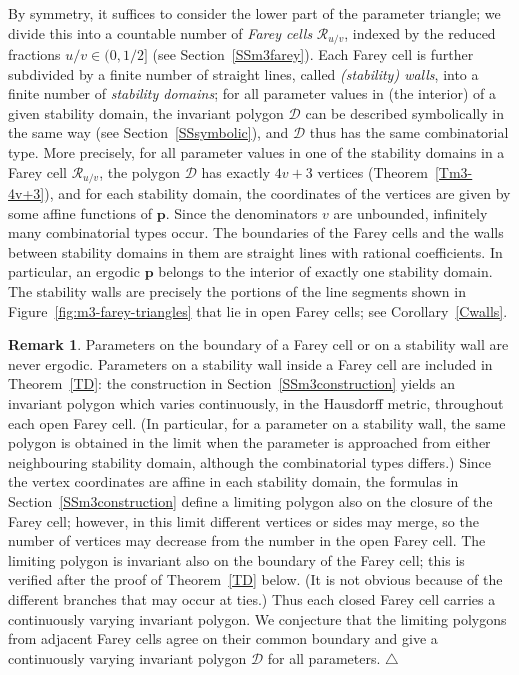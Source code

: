 \documentclass[11pt,reqno,tbtags,a4paper]{amsart}
\numberwithin{equation}{section}
\theoremstyle{plain}%
\theoremstyle{definition}
\newcommand\xqed[1]{%
    \leavevmode\unskip\penalty9999 \hbox{}\nobreak\hfill
    \quad\hbox{#1}}
\newtheorem{remarkqqq}[theorem]{Remark}
\newenvironment{remark}{\begin{remarkqqq}}
  {\xqed{$\triangle$}\end{remarkqqq}}
\theoremstyle{remark}
\newcommand{\refT}[1]{Theorem~\ref{#1}}
\newcommand{\refC}[1]{Corollary~\ref{#1}}
\newcommand{\refSS}[1]{Section~\ref{#1}}
\newcommand{\refFig}[1]{Figure~\ref{#1}}
\newcounter{cc}
\newcommand\cD{\mathcal D}
\newcommand\cR{{\mathcal R}}
\newcommand\vp{\mathbf{p}}
\newcommand\0{{\boldsymbol 0}}
\newcommand\1{{\boldsymbol 1}}
\begin{document}
By symmetry, it suffices to consider
the lower part of the parameter triangle; we divide this into a 
countable number of
\emph{Farey cells} $\cR_{u/v}$, 
indexed by the reduced fractions $u/v\in(0,1/2]$
(see \refSS{SSm3farey}).
Each Farey cell is further subdivided 
by a finite number of straight lines, 
called \emph{(stability) walls},
into a finite number of 
\emph{stability domains};
for all parameter values in (the interior) of a given stability domain,
the invariant polygon $\cD$ 
can be described symbolically in the same way (see \refSS{SSsymbolic}),
and $\cD$ thus has the same combinatorial type.
More precisely, for all parameter values in one of the stability domains in a
Farey cell $\cR_{u/v}$, 
the polygon $\cD$  has exactly $4v+3$ vertices
(\refT{Tm3-4v+3}), 
and for each stability domain, 
the coordinates of the vertices are given by some affine functions of $\vp$.
Since the denominators $v$ are unbounded, infinitely many combinatorial types
occur. 
The boundaries of the Farey cells and 
the walls between stability domains in them
are straight lines with rational coefficients.
In particular, an ergodic $\vp$ belongs to the interior of exactly one
stability domain.
The stability walls are precisely the portions of the line segments
shown in \refFig{fig:m3-farey-triangles} that lie in open Farey cells;
see \refC{Cwalls}.

\begin{remark}\label{Rrand}
  Parameters on the boundary of a Farey cell or on a stability wall are
never ergodic.  
Parameters on a stability wall inside a Farey cell are included in \refT{TD}:
the construction in \refSS{SSm3construction} yields 
an invariant polygon which varies continuously, in the Hausdorff metric,
throughout each open Farey cell.
(In particular, for a parameter on a stability wall,
the same polygon is obtained in the limit when the parameter
is approached from either neighbouring stability domain, although the
combinatorial types differs.) 
Since the vertex coordinates are affine in each stability domain, the
formulas in \refSS{SSm3construction} 
define a limiting polygon also on the closure of the Farey cell;
however, in this limit different vertices or sides may merge,
so the number of vertices may decrease from the number in the open Farey cell.
The limiting polygon is invariant also on the boundary of the Farey cell;
this is verified after the proof of \refT{TD} below.
(It is not obvious because of the different branches that may occur at ties.)
Thus each closed Farey cell carries a continuously varying invariant polygon.
We conjecture that the limiting polygons from adjacent Farey cells agree on
their common boundary
and give a continuously varying invariant polygon $\cD$ for all parameters.
\end{remark}
\end{document}
